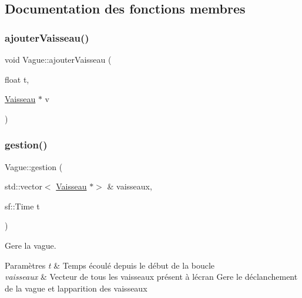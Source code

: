 \subsection{Documentation des fonctions membres}
\mbox{\label{class_vague_a82124cdeb165825047f9dd8164e69a16}} 
\subsubsection{\texorpdfstring{ajouter\+Vaisseau()}{ajouterVaisseau()}}
{\footnotesize\ttfamily void Vague\+::ajouter\+Vaisseau (\begin{DoxyParamCaption}\item[{float}]{t,  }\item[{\hyperlink{class_vaisseau}{Vaisseau} $\ast$}]{v }\end{DoxyParamCaption})}

\mbox{\label{class_vague_a37649d5f8063b1d516ce1f865a9d521d}} 
\subsubsection{\texorpdfstring{gestion()}{gestion()}}
{\footnotesize\ttfamily Vague\+::gestion (\begin{DoxyParamCaption}\item[{std\+::vector$<$ \hyperlink{class_vaisseau}{Vaisseau} $\ast$$>$ \&}]{vaisseaux,  }\item[{sf\+::\+Time}]{t }\end{DoxyParamCaption})}



Gere la vague. 


\begin{DoxyParams}{Paramètres}
{\em t} & Temps écoulé depuis le début de la boucle \\
\hline
{\em vaisseaux} & Vecteur de tous les vaisseaux présent à l\textquotesingle{}écran Gere le déclanchement de la vague et l\textquotesingle{}apparition des vaisseaux \\
\hline
\end{DoxyParams}
\mbox{\label{class_vague_a564d612f69751dd198ffa7ac61ea04dd}} 
